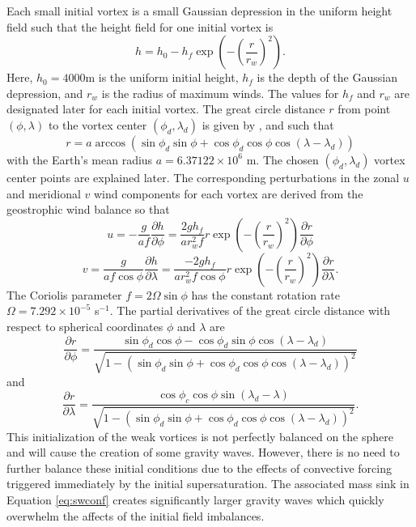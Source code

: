 \documentclass{ametsoc}
\begin{document}
  Each small initial vortex is a small Gaussian depression
  in the uniform height field such that the height field for one initial vortex is
  \begin{equation}
    \label{eq:hforce} h = h_0 - h_{f} \exp{\left(-\left(\frac{r}
    {r_w}\right)^2\right)}.
  \end{equation}
 Here, $h_0 = 4000 \mathrm{ m}$ is the uniform initial height, $h_f$ is the depth 
 of the Gaussian depression, and $r_w$ 
 is the radius of maximum winds. The values for $h_f$ and $r_w$ are designated later for each initial vortex.
 The great circle distance $r$ from
 point $(\phi, \lambda)$ to the vortex center $(\phi_d, \lambda_d)$ is given by ,  and  such that
  \begin{equation}
    \label{eq:gcd} r = a \arccos \left(\sin\phi_d \sin\phi + \cos\phi_d
    \cos\phi \cos\left(\lambda - \lambda_d\right)\right)
  \end{equation}
  with the Earth's mean radius $a = 6.37122 \times 10^6$ m.  The
  chosen $(\phi_d, \lambda_d)$ vortex center points are explained later.
  The corresponding perturbations in the zonal $u$ and meridional $v$ wind  
  components for each vortex are derived from the geostrophic 
  wind balance so that
  \begin{equation}
     \label{eq:uforce} u = -\frac{g}{af}\frac{\partial h}{\partial \phi} 
     = \frac{2 g h_f}{a r_w^2 f} r \exp{\left(-\left(\frac{r}{r_w}\right)^2\right)}
     \frac{\partial r}{\partial \phi}
   \end{equation}
  \begin{equation}
     \label{eq:vforce} v = \frac{g}{af\cos\phi}\frac{\partial h}{\partial \lambda}
     = \frac{-2 g h_f}{a r_w^2 f \cos\phi} r \exp{\left(-\left(\frac{r}{r_w}\right)^2\right)}
     \frac{\partial r}{\partial \lambda}.
   \end{equation}
  The Coriolis parameter $f = 2 \Omega \sin \phi$ has the constant rotation rate
  $\Omega = 7.292 \times 10^{-5}$ s$^{-1}$. The partial derivatives of the great circle 
  distance with respect to spherical coordinates $\phi$ and $\lambda$ are
  \begin{equation} 
  	 \frac{\partial r}{\partial \phi} = \frac{\sin\phi_d\cos\phi - \cos\phi_d\sin\phi\cos\left(\lambda - \lambda_d\right)}
	 {\sqrt{1 - \left(\sin\phi_d \sin\phi + \cos\phi_d\cos\phi\cos\left(\lambda-\lambda_d\right)\right)^2}}
  \end{equation}
  and
  \begin{equation}
  	\frac{\partial r}{\partial \lambda} = \frac{\cos\phi_c\cos\phi\sin\left(\lambda_d - \lambda\right)}
	{\sqrt{1 - \left(\sin\phi_d \sin\phi + \cos\phi_d\cos\phi\cos\left(\lambda-\lambda_d\right)\right)^2}}.
  \end{equation}
  This initialization of the weak vortices is not perfectly balanced on the sphere and 
  will cause the creation of some gravity waves. However, there is no need to further balance
  these initial conditions due to the effects of convective forcing 
  triggered immediately by the initial supersaturation.
  The associated mass sink in Equation \ref{eq:swconf} creates significantly larger gravity waves
   which quickly overwhelm the affects of the initial field imbalances. 
  
\end{document}
